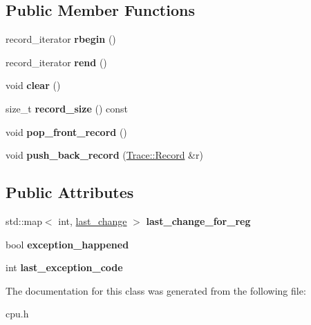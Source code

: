 \subsection*{Public Member Functions}
\begin{DoxyCompactItemize}
\item 
\hypertarget{classTrace_aecfd5dcb23567239137fc3a0b8b95a07}{
record\_\-iterator {\bfseries rbegin} ()}
\label{classTrace_aecfd5dcb23567239137fc3a0b8b95a07}

\item 
\hypertarget{classTrace_a37e3f1074220029b6f693bafcc99dccf}{
record\_\-iterator {\bfseries rend} ()}
\label{classTrace_a37e3f1074220029b6f693bafcc99dccf}

\item 
\hypertarget{classTrace_a7e719f22d141f62d4da6f22d13e27972}{
void {\bfseries clear} ()}
\label{classTrace_a7e719f22d141f62d4da6f22d13e27972}

\item 
\hypertarget{classTrace_a80451c390ed1f70bba6b4ed422b8bfa3}{
size\_\-t {\bfseries record\_\-size} () const }
\label{classTrace_a80451c390ed1f70bba6b4ed422b8bfa3}

\item 
\hypertarget{classTrace_a86280544f756d1de4ca1b2ac94343a3e}{
void {\bfseries pop\_\-front\_\-record} ()}
\label{classTrace_a86280544f756d1de4ca1b2ac94343a3e}

\item 
\hypertarget{classTrace_a047322e249c7d70db314689bea6dc2e0}{
void {\bfseries push\_\-back\_\-record} (\hyperlink{structTrace_1_1Record}{Trace::Record} \&r)}
\label{classTrace_a047322e249c7d70db314689bea6dc2e0}

\end{DoxyCompactItemize}
\subsection*{Public Attributes}
\begin{DoxyCompactItemize}
\item 
\hypertarget{classTrace_a3b817748af702ec1e1f4f47c7c622c1a}{
std::map$<$ int, \hyperlink{structlast__change}{last\_\-change} $>$ {\bfseries last\_\-change\_\-for\_\-reg}}
\label{classTrace_a3b817748af702ec1e1f4f47c7c622c1a}

\item 
\hypertarget{classTrace_a829f74b75c3a0f8fe5d1be97ccafa5d1}{
bool {\bfseries exception\_\-happened}}
\label{classTrace_a829f74b75c3a0f8fe5d1be97ccafa5d1}

\item 
\hypertarget{classTrace_a52b0dd9f6e0b024ef6b0dd51e806537e}{
int {\bfseries last\_\-exception\_\-code}}
\label{classTrace_a52b0dd9f6e0b024ef6b0dd51e806537e}

\end{DoxyCompactItemize}


The documentation for this class was generated from the following file:\begin{DoxyCompactItemize}
\item 
cpu.h\end{DoxyCompactItemize}
